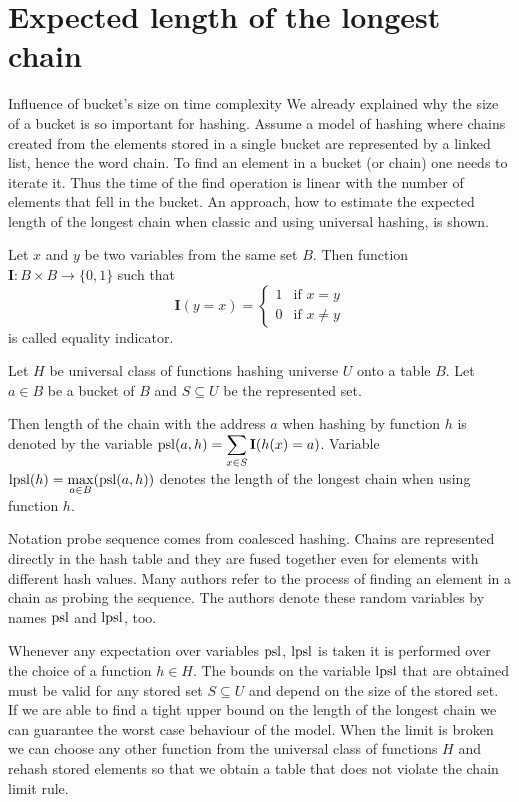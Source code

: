 \chapter{Expected length of the longest chain}
\label{chapter-elpsl}

\begin{section}{Influence of bucket's size on time complexity}
We already explained why the size of a bucket is so important for hashing. Assume a model of hashing where chains created from the elements stored in a single bucket are represented by a linked list, hence the word chain. To find an element in a bucket (or chain) one needs to iterate it. Thus the time of the find operation is linear with the number of elements that fell in the bucket. An approach, how to estimate the expected length of the longest chain when classic and using universal hashing, is shown.

\begin{definition}
Let $x$ and $y$ be two variables from the same set $B$. Then function $\mathbf{I}: B \times B \rightarrow \{0, 1\}$ such that
\[
 \mathbf{I}(y = x) =
  \begin{cases}
   1 & \text{if } x = y \\
   0 & \text{if } x \neq y
  \end{cases}
\]
is called equality indicator.
\end{definition}

\begin{definition}
Let $H$ be universal class of functions hashing universe $U$ onto a table $B$. Let $a \in B$ be a bucket of $B$ and $S \subseteq U$ be the represented set. 

Then length of the chain with the address $a$ when hashing by function $h$ is denoted by the variable $\mathrm{psl}(a, h) = \displaystyle \sum_{x \in S} \mathbf{I}(h(x) = a)$. Variable $\mathrm{lpsl}(h) = \displaystyle \max_{a \in B} (\mathrm{psl}(a, h))$ denotes the length of the longest chain when using function $h$.
\end{definition}

Notation probe sequence comes from coalesced hashing. Chains are represented directly in the hash table and they are fused together even for elements with different hash values. Many authors refer to the process of finding an element in a chain as probing the sequence. The authors denote these random variables by names $\mathrm{psl}$ and $\mathrm{lpsl}$, too. %

Whenever any expectation over variables $\mathrm{psl}$, $\mathrm{lpsl}$ is taken it is performed over the choice of a function $h \in H$. The bounds on the variable $\mathrm{lpsl}$ that are obtained must be valid for any stored set $S \subseteq U$ and depend on the size of the stored set. If we are able to find a tight upper bound on the length of the longest chain we can guarantee the worst case behaviour of the model. When the limit is broken we can choose any other function from the universal class of functions $H$ and rehash stored elements so that we obtain a table that does not violate the chain limit rule.


\end{section}
